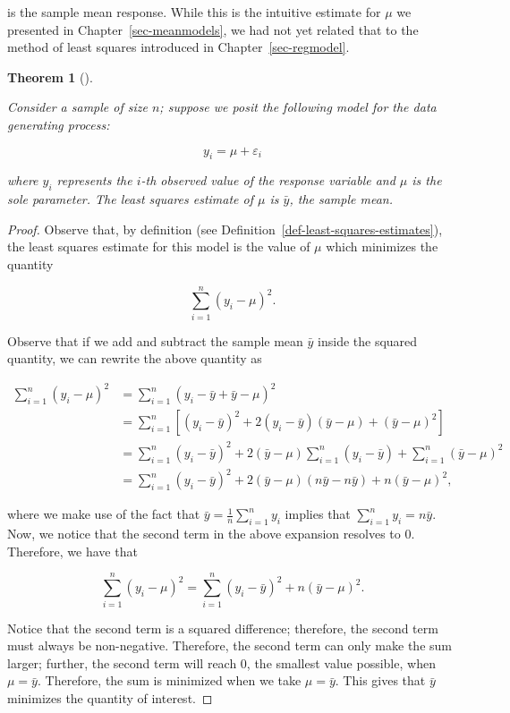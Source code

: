 \documentclass[
  letterpaper,
  DIV=11,
  numbers=noendperiod]{scrreprt}
\theoremstyle{plain}
\newtheorem{theorem}{Theorem}[chapter]
\theoremstyle{definition}
\theoremstyle{definition}
\theoremstyle{remark}
\begin{document}
is the sample mean response. While this is the intuitive estimate for
\(\mu\) we presented in Chapter~\ref{sec-meanmodels}, we had not yet
related that to the method of least squares introduced in
Chapter~\ref{sec-regmodel}.

\begin{theorem}[]\protect\hypertarget{thm-app-teststat-ls-one}{}\label{thm-app-teststat-ls-one}

Consider a sample of size \(n\); suppose we posit the following model
for the data generating process:

\[y_i = \mu + \varepsilon_i\]

where \(y_i\) represents the \(i\)-th observed value of the response
variable and \(\mu\) is the sole parameter. The least squares estimate
of \(\mu\) is \(\bar{y}\), the sample mean.

\end{theorem}

\begin{proof}

Observe that, by definition (see
Definition~\ref{def-least-squares-estimates}), the least squares
estimate for this model is the value of \(\mu\) which minimizes the
quantity

\[\sum_{i=1}^{n} \left(y_i - \mu\right)^2.\]

Observe that if we add and subtract the sample mean \(\bar{y}\) inside
the squared quantity, we can rewrite the above quantity as

\[
\begin{aligned}
  \sum_{i=1}^{n} \left(y_i - \mu\right)^2 
    &= \sum_{i=1}^{n} \left(y_i - \bar{y} + \bar{y} - \mu\right)^2 \\
    &= \sum_{i=1}^{n} \left[\left(y_i - \bar{y}\right)^2 + 2\left(y_i - \bar{y}\right)\left(\bar{y} - \mu\right) + \left(\bar{y} - \mu\right)^2\right] \\
    &= \sum_{i=1}^{n} \left(y_i - \bar{y}\right)^2 + 2\left(\bar{y} - \mu\right) \sum_{i=1}^{n}\left(y_i - \bar{y}\right) + \sum_{i=1}^{n}\left(\bar{y} - \mu\right)^2 \\
    &= \sum_{i=1}^{n} \left(y_i - \bar{y}\right)^2 + 2\left(\bar{y} - \mu\right) \left(n\bar{y} - n\bar{y}\right) + n\left(\bar{y} - \mu\right)^2, 
\end{aligned}
\]

where we make use of the fact that
\(\bar{y} = \frac{1}{n}\sum_{i=1}^{n} y_i\) implies that
\(\sum_{i=1}^{n} y_i = n\bar{y}\). Now, we notice that the second term
in the above expansion resolves to 0. Therefore, we have that

\[\sum_{i=1}^{n} \left(y_i - \mu\right)^2 = \sum_{i=1}^{n} \left(y_i - \bar{y}\right)^2 + n\left(\bar{y} - \mu\right)^2.\]

Notice that the second term is a squared difference; therefore, the
second term must always be non-negative. Therefore, the second term can
only make the sum larger; further, the second term will reach 0, the
smallest value possible, when \(\mu = \bar{y}\). Therefore, the sum is
minimized when we take \(\mu = \bar{y}\). This gives that \(\bar{y}\)
minimizes the quantity of interest.

\end{proof}
\end{document}
